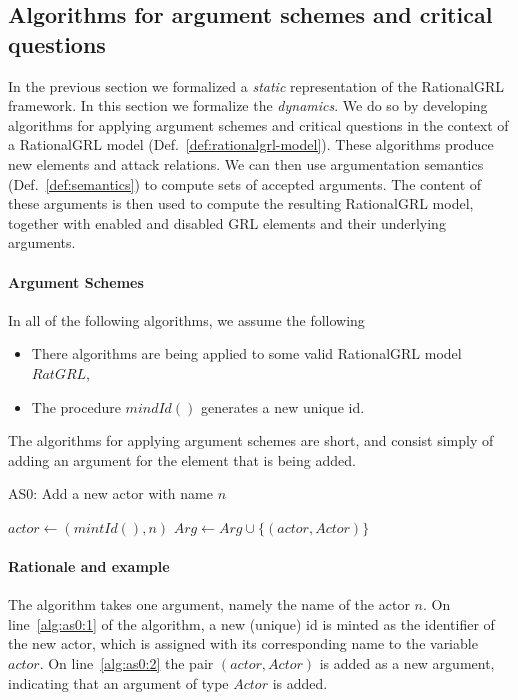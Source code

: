 
\subsection{Algorithms for argument schemes and critical questions}
\label{sect:algorithms}

In the previous section we formalized a \emph{static} representation of the RationalGRL framework. In this section we formalize the \emph{dynamics}. We do so by developing algorithms for applying argument schemes and critical questions in the context of a RationalGRL model (Def.~\ref{def:rationalgrl-model}). These algorithms produce new elements and attack relations. We can then use argumentation semantics (Def.~\ref{def:semantics}) to compute sets of accepted arguments. The content of these arguments is then used to compute the resulting RationalGRL model, together with enabled and disabled GRL elements and their underlying arguments.

\paragraph{Argument Schemes}

In all of the following algorithms, we assume the following
\begin{itemize}
\item There algorithms are being applied to some valid RationalGRL model $RatGRL$,
\item The procedure $mindId()$ generates a new unique id.
\end{itemize}

The algorithms for applying argument schemes are short, and consist simply of adding an argument for the element that is being added.

\begin{algorithm}[h]
  \caption{AS0: Add a new actor with name $n$}\label{alg:as0}
  \begin{algorithmic}[1]
    \State $actor \leftarrow (mintId(), n)$ \label{alg:as0:1}
    \State $Arg\leftarrow Arg \cup \{(actor,Actor)\}$\label{alg:as0:2}
    \EndProcedure
  \end{algorithmic}
\end{algorithm}

\paragraph{Rationale and example} The algorithm takes one argument, namely the name of the actor $n$. On line~\ref{alg:as0:1} of the algorithm, a new (unique) id is minted as the identifier of the new actor, which is assigned with its corresponding name to the variable $actor$. On line~\ref{alg:as0:2} the pair $(actor,Actor)$ is added as a new argument, indicating that an argument of type $Actor$ is added.

